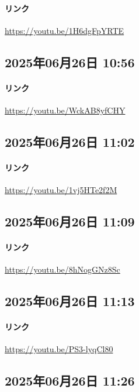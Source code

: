 \paragraph{リンク}
\url{https://youtu.be/1H6dgFpYRTE}

\subsection*{2025年06月26日 10:56}

\paragraph{リンク}
\url{https://youtu.be/WckAB8yfCHY}

\subsection*{2025年06月26日 11:02}

\paragraph{リンク}
\url{https://youtu.be/1vj5HTe2f2M}

\subsection*{2025年06月26日 11:09}

\paragraph{リンク}
\url{https://youtu.be/8hNogGNz8Sc}

\subsection*{2025年06月26日 11:13}

\paragraph{リンク}
\url{https://youtu.be/PS3-lyqCl80}

\subsection*{2025年06月26日 11:26}

